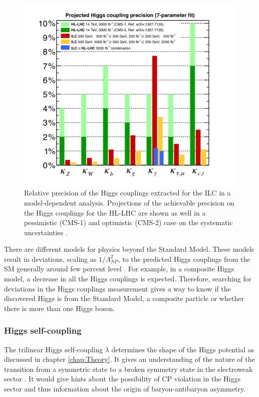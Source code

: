 \begin{figure}[htbp]
  \centering
  \includegraphics[width=0.7\linewidth]{chap2/fig/HiggsCouplings_LHCComp.png}
  \caption{Relative precision of the Higgs couplings extracted for the ILC in a model-dependent analysis. Projections of the achievable precision on the Higgs couplings for the HL-LHC are shown as well in a pessimistic (CMS-1) and optimistic (CMS-2) case on the systematic uncertainties \cite{Fujii:2015jha}.}  \label{fig:HiggsCouplings}
\end{figure}

There are different models for physics beyond the Standard Model. These models result in deviations, scaling as $1/\Lambda^2_{NP}$, to the predicted Higgs couplings from the SM generally around few percent level \cite{Gupta:2012mi}. For example, in a composite Higgs model, a decrease in all the Higgs couplings is expected. Therefore, searching for deviations in the Higgs couplings measurement gives a way to know if the discovered Higgs is from the Standard Model, a composite particle or whether there is more than one Higgs boson.

\subsubsection{Higgs self-coupling}

The trilinear Higgs self-coupling $\lambda$ determines the shape of the Higgs potential as discussed in chapter \ref{chap:Theory}. It gives an understanding of the nature of the transition from a symmetric state to a broken symmetry state in the electroweak sector \cite{Kajantie:1996mn}. It would give hints about the possibility of CP violation in the Higgs sector and thus information about the origin of baryon-antibaryon asymmetry.

